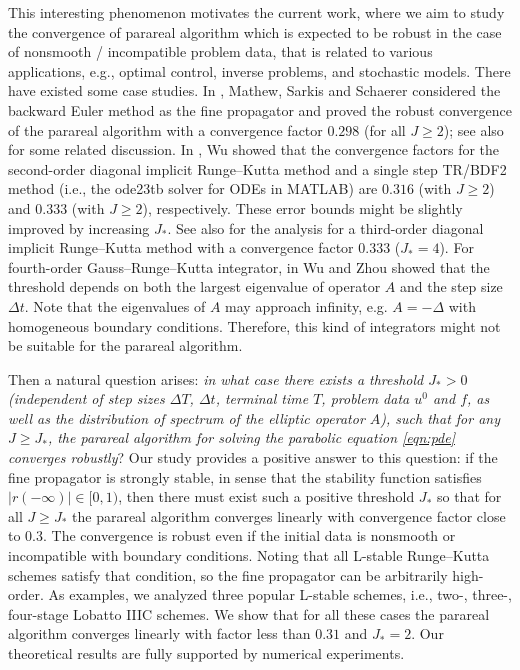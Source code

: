 \documentclass[a4paper, oneside]{book}
\begin{document}
This interesting phenomenon motivates the current work, where we aim to study the convergence of parareal algorithm which is expected to be robust in the case of nonsmooth / incompatible problem data, that is related to various applications, e.g., optimal control, inverse problems, and stochastic models.
There have existed some case studies.
In \cite{MathewSarkisSchaerer:2010},
Mathew, Sarkis and Schaerer considered
the backward Euler method as the fine propagator  and proved
the robust convergence of the parareal algorithm with a convergence factor $0.298$ (for all $J \ge 2$); see also \cite{GanderVandewalle:2007,Staff:2005} for some related discussion. In \cite{Wu:2015}, Wu showed that the convergence factors
for the second-order diagonal implicit Runge--Kutta method
and a single step TR/BDF2 method (i.e., the ode23tb solver for ODEs in MATLAB)
are $0.316$ (with $J\ge 2$) and $0.333$ (with $J\ge 2$), respectively.
These error bounds might be slightly improved
by increasing $J_*$.
See also \cite{WuZhou:2015} for the analysis for a third-order diagonal implicit Runge--Kutta method with a convergence factor $0.333$ ($J_*=4$). For fourth-order Gauss--Runge--Kutta integrator, in \cite{WuZhou:2015} Wu and Zhou showed that the threshold depends on both the largest eigenvalue of operator $A$ and the step size $\Delta t$. Note that the eigenvalues of $A$ may approach infinity, e.g. $A=-\Delta$ with homogeneous boundary conditions. Therefore, this kind of integrators might not be suitable for the parareal algorithm.

Then a natural question arises: \textsl{in what case there exists a threshold $J_*>0$ (independent of step sizes $\Delta T$, $\Delta t$, terminal time $T$,
problem data $u^0$ and $f$,
as well as the distribution of spectrum of the elliptic
operator $A$), such that
for any $J\ge J_*$, the parareal algorithm for solving the parabolic equation \eqref{eqn:pde} converges robustly}?
Our study provides a positive answer to this question: if the fine propagator is strongly stable, in sense that the stability function satisfies $|r(-\infty)| \in [0,1)$, then
there must exist such a positive threshold $J_*$ so that for all $J\ge J_*$
the parareal algorithm converges linearly with convergence factor close to $0.3$.
The convergence is robust even if the initial data is nonsmooth or incompatible with boundary conditions.
Noting that all L-stable Runge--Kutta schemes satisfy that condition, so the fine propagator  can be arbitrarily high-order.
As examples, we analyzed three popular L-stable schemes, i.e., two-, three-, four-stage Lobatto IIIC schemes. We show that for all these cases the parareal algorithm converges linearly with factor less than $0.31$
and $J_*=2$.
Our theoretical results are fully supported by numerical experiments.
\end{document}
